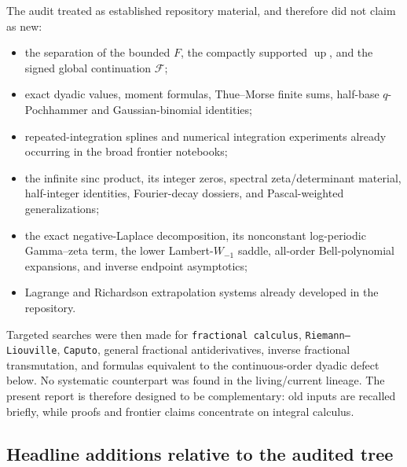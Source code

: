 \documentclass[11pt]{article}
\theoremstyle{definition}
\theoremstyle{remark}
\newcommand{\Up}{\operatorname{up}}
\newcommand{\extF}{\mathcal F}
\begin{document}
The audit treated as established repository material, and therefore did not claim as new:
\begin{itemize}
\item the separation of the bounded $F$, the compactly supported $\Up$, and the signed global
      continuation $\extF$;
\item exact dyadic values, moment formulas, Thue--Morse finite sums, half-base
      $q$-Pochhammer and Gaussian-binomial identities;
\item repeated-integration splines and numerical integration experiments already occurring in
      the broad frontier notebooks;
\item the infinite sinc product, its integer zeros, spectral zeta/determinant material,
      half-integer identities, Fourier-decay dossiers, and Pascal-weighted generalizations;
\item the exact negative-Laplace decomposition, its nonconstant log-periodic Gamma--zeta term,
      the lower Lambert-$W_{-1}$ saddle, all-order Bell-polynomial expansions, and inverse
      endpoint asymptotics;
\item Lagrange and Richardson extrapolation systems already developed in the repository.
\end{itemize}

Targeted searches were then made for \texttt{fractional calculus},
\texttt{Riemann--Liouville}, \texttt{Caputo}, general fractional antiderivatives, inverse
fractional transmutation, and formulas equivalent to the continuous-order dyadic defect below.
No systematic counterpart was found in the living/current lineage.  The present report is
therefore designed to be complementary: old inputs are recalled briefly, while proofs and
frontier claims concentrate on integral calculus.

\subsection{Headline additions relative to the audited tree}
\end{document}
